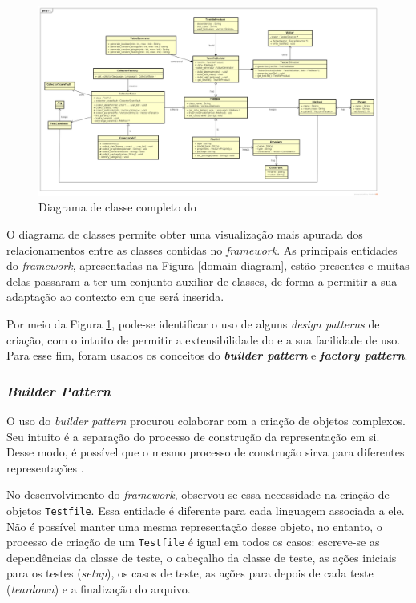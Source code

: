 \begin{landscape}
\begin{figure}[h]
  \centering
    \includegraphics[width=1.5\textwidth]{figuras/class-diagram.png}
    \caption{Diagrama de classe completo do \scarefault}
    \label{class-diagram}
\end{figure}
\FloatBarrier
\end{landscape}

O diagrama de classes permite obter uma visualização mais apurada dos
relacionamentos entre as classes contidas no \textit{framework}. As principais
entidades do \textit{framework}, apresentadas na Figura \ref{domain-diagram},
estão presentes e muitas delas passaram a ter um conjunto auxiliar de classes,
de forma a permitir a sua adaptação ao contexto em que será inserida.

Por meio da Figura \ref{class-diagram}, pode-se identificar o uso de alguns
\textit{design patterns} de criação, com o intuito de permitir a
extensibilidade do \framework e a sua facilidade de uso. Para esse fim,
foram usados os conceitos do \textbf{\textit{builder pattern}} e
\textbf{\textit{factory pattern}}.

\subsubsection{\textit{Builder Pattern}}
O uso do \textit{builder pattern} procurou colaborar com a criação de objetos complexos. Seu intuito é a separação do processo
de construção da representação em si. Desse modo, é possível que o
mesmo processo de construção sirva para diferentes representações
\cite{gammaEtAl1994}.

No desenvolvimento do \textit{framework}, observou-se essa necessidade na
criação de objetos \lstinline|Testfile|. Essa entidade é diferente para
cada linguagem associada a ele. Não é possível manter uma mesma
representação desse objeto, no entanto, o processo de criação de um
\lstinline|Testfile| é igual em todos os casos: escreve-se as
dependências da classe de teste, o cabeçalho da classe de teste,
as ações iniciais para os testes (\textit{setup}),
os casos de teste, as ações para depois de cada teste
(\textit{teardown}) e a finalização do arquivo.

